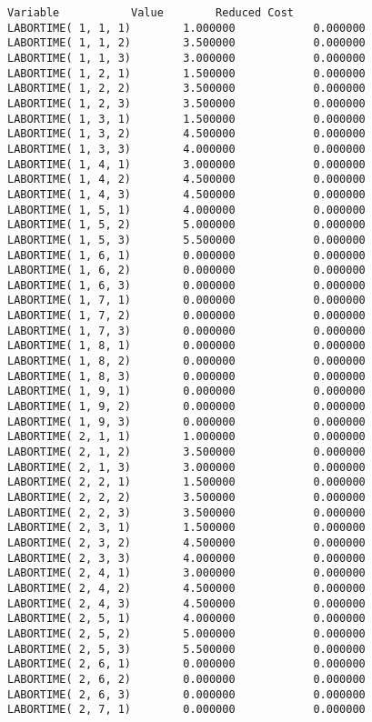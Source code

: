 \documentclass[12pt]{article}
\begin{document}
\begin{appendices}
\begin{lstlisting}
Variable           Value        Reduced Cost
LABORTIME( 1, 1, 1)        1.000000            0.000000
LABORTIME( 1, 1, 2)        3.500000            0.000000
LABORTIME( 1, 1, 3)        3.000000            0.000000
LABORTIME( 1, 2, 1)        1.500000            0.000000
LABORTIME( 1, 2, 2)        3.500000            0.000000
LABORTIME( 1, 2, 3)        3.500000            0.000000
LABORTIME( 1, 3, 1)        1.500000            0.000000
LABORTIME( 1, 3, 2)        4.500000            0.000000
LABORTIME( 1, 3, 3)        4.000000            0.000000
LABORTIME( 1, 4, 1)        3.000000            0.000000
LABORTIME( 1, 4, 2)        4.500000            0.000000
LABORTIME( 1, 4, 3)        4.500000            0.000000
LABORTIME( 1, 5, 1)        4.000000            0.000000
LABORTIME( 1, 5, 2)        5.000000            0.000000
LABORTIME( 1, 5, 3)        5.500000            0.000000
LABORTIME( 1, 6, 1)        0.000000            0.000000
LABORTIME( 1, 6, 2)        0.000000            0.000000
LABORTIME( 1, 6, 3)        0.000000            0.000000
LABORTIME( 1, 7, 1)        0.000000            0.000000
LABORTIME( 1, 7, 2)        0.000000            0.000000
LABORTIME( 1, 7, 3)        0.000000            0.000000
LABORTIME( 1, 8, 1)        0.000000            0.000000
LABORTIME( 1, 8, 2)        0.000000            0.000000
LABORTIME( 1, 8, 3)        0.000000            0.000000
LABORTIME( 1, 9, 1)        0.000000            0.000000
LABORTIME( 1, 9, 2)        0.000000            0.000000
LABORTIME( 1, 9, 3)        0.000000            0.000000
LABORTIME( 2, 1, 1)        1.000000            0.000000
LABORTIME( 2, 1, 2)        3.500000            0.000000
LABORTIME( 2, 1, 3)        3.000000            0.000000
LABORTIME( 2, 2, 1)        1.500000            0.000000
LABORTIME( 2, 2, 2)        3.500000            0.000000
LABORTIME( 2, 2, 3)        3.500000            0.000000
LABORTIME( 2, 3, 1)        1.500000            0.000000
LABORTIME( 2, 3, 2)        4.500000            0.000000
LABORTIME( 2, 3, 3)        4.000000            0.000000
LABORTIME( 2, 4, 1)        3.000000            0.000000
LABORTIME( 2, 4, 2)        4.500000            0.000000
LABORTIME( 2, 4, 3)        4.500000            0.000000
LABORTIME( 2, 5, 1)        4.000000            0.000000
LABORTIME( 2, 5, 2)        5.000000            0.000000
LABORTIME( 2, 5, 3)        5.500000            0.000000
LABORTIME( 2, 6, 1)        0.000000            0.000000
LABORTIME( 2, 6, 2)        0.000000            0.000000
LABORTIME( 2, 6, 3)        0.000000            0.000000
LABORTIME( 2, 7, 1)        0.000000            0.000000

\end{lstlisting}
\end{appendices}
\end{document}
